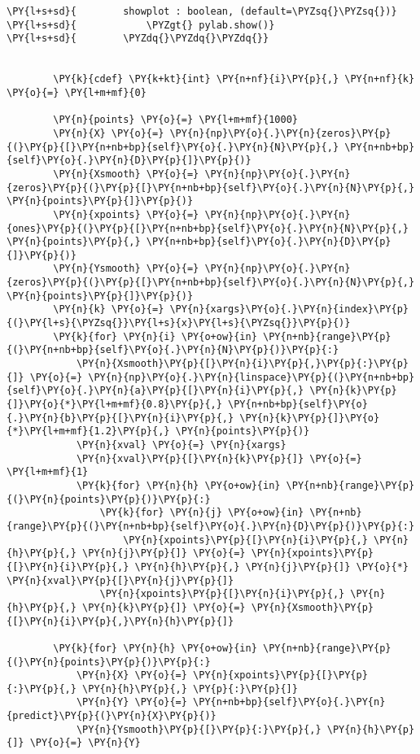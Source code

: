 \begin{Verbatim}[commandchars=\\\{\}]
\PY{l+s+sd}{        showplot : boolean, (default=\PYZsq{}\PYZsq{})}
\PY{l+s+sd}{            \PYZgt{} pylab.show()}
\PY{l+s+sd}{        \PYZdq{}\PYZdq{}\PYZdq{}}


        \PY{k}{cdef} \PY{k+kt}{int} \PY{n+nf}{i}\PY{p}{,} \PY{n+nf}{k} \PY{o}{=} \PY{l+m+mf}{0}
        
        \PY{n}{points} \PY{o}{=} \PY{l+m+mf}{1000}
        \PY{n}{X} \PY{o}{=} \PY{n}{np}\PY{o}{.}\PY{n}{zeros}\PY{p}{(}\PY{p}{[}\PY{n+nb+bp}{self}\PY{o}{.}\PY{n}{N}\PY{p}{,} \PY{n+nb+bp}{self}\PY{o}{.}\PY{n}{D}\PY{p}{]}\PY{p}{)}
        \PY{n}{Xsmooth} \PY{o}{=} \PY{n}{np}\PY{o}{.}\PY{n}{zeros}\PY{p}{(}\PY{p}{[}\PY{n+nb+bp}{self}\PY{o}{.}\PY{n}{N}\PY{p}{,} \PY{n}{points}\PY{p}{]}\PY{p}{)}
        \PY{n}{xpoints} \PY{o}{=} \PY{n}{np}\PY{o}{.}\PY{n}{ones}\PY{p}{(}\PY{p}{[}\PY{n+nb+bp}{self}\PY{o}{.}\PY{n}{N}\PY{p}{,} \PY{n}{points}\PY{p}{,} \PY{n+nb+bp}{self}\PY{o}{.}\PY{n}{D}\PY{p}{]}\PY{p}{)}
        \PY{n}{Ysmooth} \PY{o}{=} \PY{n}{np}\PY{o}{.}\PY{n}{zeros}\PY{p}{(}\PY{p}{[}\PY{n+nb+bp}{self}\PY{o}{.}\PY{n}{N}\PY{p}{,} \PY{n}{points}\PY{p}{]}\PY{p}{)}
        \PY{n}{k} \PY{o}{=} \PY{n}{xargs}\PY{o}{.}\PY{n}{index}\PY{p}{(}\PY{l+s}{\PYZsq{}}\PY{l+s}{x}\PY{l+s}{\PYZsq{}}\PY{p}{)}
        \PY{k}{for} \PY{n}{i} \PY{o+ow}{in} \PY{n+nb}{range}\PY{p}{(}\PY{n+nb+bp}{self}\PY{o}{.}\PY{n}{N}\PY{p}{)}\PY{p}{:}
            \PY{n}{Xsmooth}\PY{p}{[}\PY{n}{i}\PY{p}{,}\PY{p}{:}\PY{p}{]} \PY{o}{=} \PY{n}{np}\PY{o}{.}\PY{n}{linspace}\PY{p}{(}\PY{n+nb+bp}{self}\PY{o}{.}\PY{n}{a}\PY{p}{[}\PY{n}{i}\PY{p}{,} \PY{n}{k}\PY{p}{]}\PY{o}{*}\PY{l+m+mf}{0.8}\PY{p}{,} \PY{n+nb+bp}{self}\PY{o}{.}\PY{n}{b}\PY{p}{[}\PY{n}{i}\PY{p}{,} \PY{n}{k}\PY{p}{]}\PY{o}{*}\PY{l+m+mf}{1.2}\PY{p}{,} \PY{n}{points}\PY{p}{)}
            \PY{n}{xval} \PY{o}{=} \PY{n}{xargs}
            \PY{n}{xval}\PY{p}{[}\PY{n}{k}\PY{p}{]} \PY{o}{=} \PY{l+m+mf}{1}
            \PY{k}{for} \PY{n}{h} \PY{o+ow}{in} \PY{n+nb}{range}\PY{p}{(}\PY{n}{points}\PY{p}{)}\PY{p}{:}
                \PY{k}{for} \PY{n}{j} \PY{o+ow}{in} \PY{n+nb}{range}\PY{p}{(}\PY{n+nb+bp}{self}\PY{o}{.}\PY{n}{D}\PY{p}{)}\PY{p}{:}
                    \PY{n}{xpoints}\PY{p}{[}\PY{n}{i}\PY{p}{,} \PY{n}{h}\PY{p}{,} \PY{n}{j}\PY{p}{]} \PY{o}{=} \PY{n}{xpoints}\PY{p}{[}\PY{n}{i}\PY{p}{,} \PY{n}{h}\PY{p}{,} \PY{n}{j}\PY{p}{]} \PY{o}{*} \PY{n}{xval}\PY{p}{[}\PY{n}{j}\PY{p}{]}
                \PY{n}{xpoints}\PY{p}{[}\PY{n}{i}\PY{p}{,} \PY{n}{h}\PY{p}{,} \PY{n}{k}\PY{p}{]} \PY{o}{=} \PY{n}{Xsmooth}\PY{p}{[}\PY{n}{i}\PY{p}{,}\PY{n}{h}\PY{p}{]}

        \PY{k}{for} \PY{n}{h} \PY{o+ow}{in} \PY{n+nb}{range}\PY{p}{(}\PY{n}{points}\PY{p}{)}\PY{p}{:}
            \PY{n}{X} \PY{o}{=} \PY{n}{xpoints}\PY{p}{[}\PY{p}{:}\PY{p}{,} \PY{n}{h}\PY{p}{,} \PY{p}{:}\PY{p}{]}
            \PY{n}{Y} \PY{o}{=} \PY{n+nb+bp}{self}\PY{o}{.}\PY{n}{predict}\PY{p}{(}\PY{n}{X}\PY{p}{)}
            \PY{n}{Ysmooth}\PY{p}{[}\PY{p}{:}\PY{p}{,} \PY{n}{h}\PY{p}{]} \PY{o}{=} \PY{n}{Y}


\end{Verbatim}
